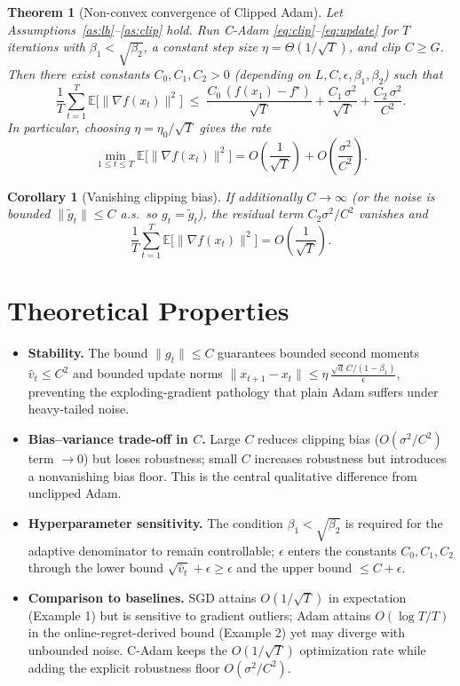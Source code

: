 \documentclass[11pt]{article}
\newtheorem{theorem}{Theorem}
\newtheorem{corollary}{Corollary}
\begin{document}
\begin{theorem}[Non-convex convergence of Clipped Adam]\label{thm:main}
Let Assumptions~\ref{as:lb}--\ref{as:clip} hold. Run C-Adam
\eqref{eq:clip}--\eqref{eq:update} for $T$ iterations with
$\beta_1 < \sqrt{\beta_2}$, a constant step size
$\eta = \Theta(1/\sqrt{T})$, and clip $C\ge G$. Then there exist constants
$C_0,C_1,C_2>0$ (depending on $L,C,\epsilon,\beta_1,\beta_2$) such that
\[
\frac{1}{T}\sum_{t=1}^{T}\mathbb{E}\big[\|\nabla f(x_t)\|^2\big]
\;\le\;
\frac{C_0\,(f(x_1)-f^\star)}{\sqrt{T}}
+\frac{C_1\,\sigma^2}{\sqrt{T}}
+\frac{C_2\,\sigma^2}{C^2}.
\]
In particular, choosing $\eta=\eta_0/\sqrt{T}$ gives the rate
\[
\min_{1\le t\le T}\mathbb{E}\big[\|\nabla f(x_t)\|^2\big]
= O\!\left(\frac{1}{\sqrt{T}}\right) + O\!\left(\frac{\sigma^2}{C^2}\right).
\]
\end{theorem}

\begin{corollary}[Vanishing clipping bias]\label{cor:nobias}
If additionally $C \to \infty$ (or the noise is bounded $\|\widetilde g_t\|\le C$ a.s.\ so
$g_t=\widetilde g_t$), the residual term $C_2\sigma^2/C^2$ vanishes and
\[
\frac{1}{T}\sum_{t=1}^{T}\mathbb{E}\big[\|\nabla f(x_t)\|^2\big]
= O\!\left(\frac{1}{\sqrt{T}}\right).
\]
\end{corollary}

\section*{Theoretical Properties}

\begin{itemize}
\item \textbf{Stability.} The bound $\|g_t\|\le C$ guarantees bounded second moments
$\hat v_t\le C^2$ and bounded update norms
$\|x_{t+1}-x_t\|\le \eta\, \frac{\sqrt d\, C/(1-\beta_1)}{\epsilon}$, preventing the
exploding-gradient pathology that plain Adam suffers under heavy-tailed noise.
\item \textbf{Bias--variance trade-off in $C$.} Large $C$ reduces clipping bias
($O(\sigma^2/C^2)$ term $\to 0$) but loses robustness; small $C$ increases robustness but
introduces a nonvanishing bias floor. This is the central qualitative difference from
unclipped Adam.
\item \textbf{Hyperparameter sensitivity.} The condition $\beta_1<\sqrt{\beta_2}$ is
required for the adaptive denominator to remain controllable; $\epsilon$ enters the
constants $C_0,C_1,C_2$ through the lower bound $\sqrt{\hat v_t}+\epsilon\ge\epsilon$ and
the upper bound $\le C+\epsilon$.
\item \textbf{Comparison to baselines.} SGD attains $O(1/\sqrt T)$ in expectation
(Example 1) but is sensitive to gradient outliers; Adam attains $O(\log T / T)$ in the
online-regret-derived bound (Example 2) yet may diverge with unbounded noise. C-Adam
keeps the $O(1/\sqrt T)$ optimization rate while adding the explicit robustness floor
$O(\sigma^2/C^2)$.
\end{itemize}
\end{document}
